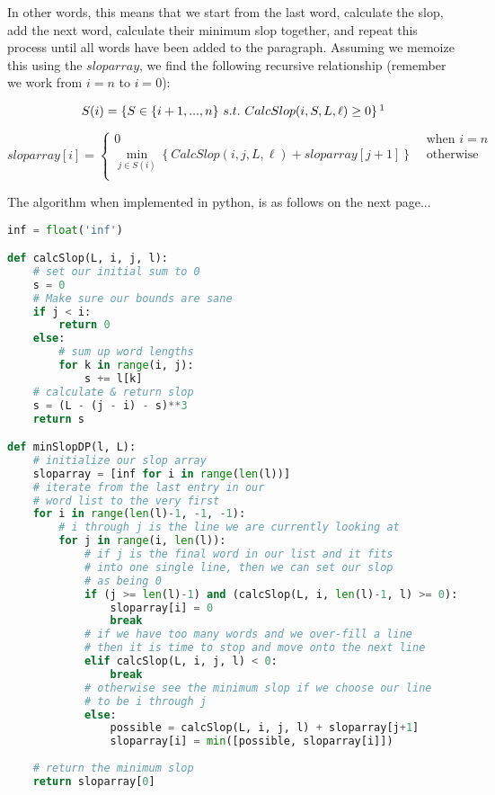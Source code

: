 \documentclass[11pt, letterpaper]{article}
\begin{document}
\quad In other words, this means that we start from the last word, calculate the slop, add the next word, calculate their minimum slop together, and repeat this process until all words have been added to the paragraph. Assuming we memoize this using the $sloparray$, we find the following recursive relationship (remember we work from $i = n$ to $i = 0$):

\[
S(i) = \left\{ S \in \{ i+1, ..., n \}\ s.t.\ CalcSlop(i, S, L, \ell) \geq 0 \right\} \footnotemark
\]

\[
sloparray[i] = 
\begin{cases}
0 & \text{ when } i = n \\
\underset{j \in S(i)}{\min} \left\{CalcSlop(i, j, L, \ell) + sloparray[j+1] \right\} & \text{ otherwise }\\
\end{cases}
\]

\quad The algorithm when implemented in python, is as follows on the next page...

\bigbreak
\bigbreak

\addtocounter{footnote}{-1}




\pagebreak

\begin{lstlisting}[language=python]
inf = float('inf')

def calcSlop(L, i, j, l):
    # set our initial sum to 0
    s = 0
    # Make sure our bounds are sane
    if j < i:
        return 0
    else:
        # sum up word lengths
        for k in range(i, j):
            s += l[k]
    # calculate & return slop
    s = (L - (j - i) - s)**3
    return s

def minSlopDP(l, L):
    # initialize our slop array
    sloparray = [inf for i in range(len(l))]
    # iterate from the last entry in our
    # word list to the very first
    for i in range(len(l)-1, -1, -1):
        # i through j is the line we are currently looking at
        for j in range(i, len(l)):
            # if j is the final word in our list and it fits
            # into one single line, then we can set our slop
            # as being 0
            if (j >= len(l)-1) and (calcSlop(L, i, len(l)-1, l) >= 0):
                sloparray[i] = 0
                break
            # if we have too many words and we over-fill a line
            # then it is time to stop and move onto the next line
            elif calcSlop(L, i, j, l) < 0:
                break
            # otherwise see the minimum slop if we choose our line
            # to be i through j
            else:
                possible = calcSlop(L, i, j, l) + sloparray[j+1]
                sloparray[i] = min([possible, sloparray[i]])
    
    # return the minimum slop
    return sloparray[0]
\end{lstlisting}
\pagebreak
\end{document}
